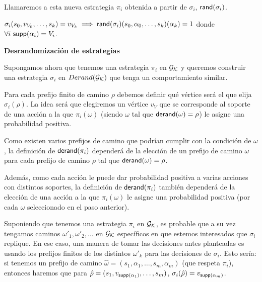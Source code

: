 Llamaremos a esta nueva estrategia $\pi_i$ obtenida a partir de $\sigma_i$,
$\textsf{rand}(\sigma_i)$.

\begin{center}
	$\sigma_i(s_0, v_{V_0}, \dots, s_k) = v_{V_k} \implies \textsf{rand}(\sigma_i)(s_0, \alpha_0, \dots, s_k)(\alpha_k) = 1$ donde \\ $\forall i \ \textsf{supp}(\alpha_i) = V_i$.
\end{center}

\textbf{Desrandomización de estrategias}

Supongamos ahora que tenemos una estrategia $\pi_i$ en $\mathcal{G}_{\mathcal{K}}$ y queremos
construir una estrategia $\sigma_i$ en $Derand(\mathcal{G}_{\mathcal{K}})$ que tenga un comportamiento
similar.

Para cada prefijo finito de camino $\rho$ debemos definir qué vértice será el
que elija $\sigma_i(\rho)$. La idea será que elegiremos un vértice $v_V$ que se
corresponde al soporte de una acción a la que $\pi_i(\omega)$ (siendo $\omega$
tal que $\textsf{derand}(\omega) = \rho$) le asigne una probabilidad positiva.

Como existen varios prefijos de camino que podrían cumplir con la condición de
$\omega$, la definición de $\textsf{derand}(\pi_i)$ dependerá de la elección de un
prefijo de camino $\omega$ para cada prefijo de camino $\rho$ tal que
$\textsf{derand}(\omega) = \rho$.

Además, como cada acción le puede dar probabilidad positiva a varias acciones
con distintos soportes, la definición de $\textsf{derand}(\pi_i)$ también dependerá de
la elección de una acción a la que $\pi_i(\omega)$ le asigne una probabilidad
positiva (por cada $\omega$ seleccionado en el paso anterior).

\begin{boxgris}{}
	Suponiendo que tenemos una estrategia $\pi_i$ en $\mathcal{G}_{\mathcal{K}}$, es probable que a su vez tengamos caminos $\omega'_1, \omega'_2, \dots$ en $\mathcal{G}_{\mathcal{K}}$ específicos en que estemos interesados que $\sigma_i$ replique. En ese caso, una manera de tomar las decisiones antes planteadas es usando los prefijos finitos de los distintos $\omega'_k$ para las decisiones de $\sigma_i$. Esto sería: si tenemos un prefijo de camino $\hat \omega = (s_1, \alpha_1, \dots, s_m, \alpha_m)$ (que respeta $\pi_i$), entonces haremos que para $\hat \rho = (s_1, v_{\textsf{supp}(\alpha_1)}, \dots, s_m)$, $\sigma_i(\hat \rho) = v_{\textsf{supp}(\alpha_m)}$.
\end{boxgris}

